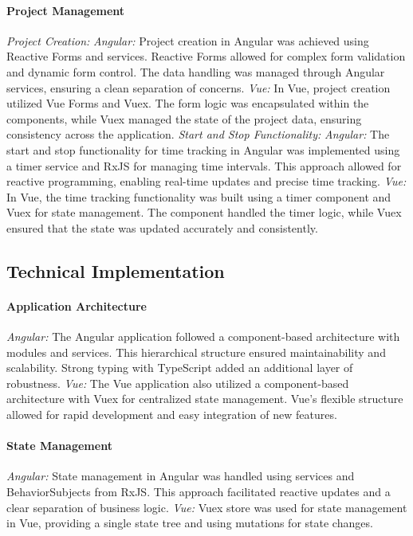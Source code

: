 \documentclass[conference]{IEEEtran}
\begin{document}
\paragraph{Project Management}
\textit{Project Creation:\newline}
\textit{Angular: }Project creation in Angular was achieved using Reactive Forms and services. Reactive Forms allowed for complex form validation and dynamic form control. The data handling was managed through Angular services, ensuring a clean separation of concerns.
\newline\textit{Vue: }In Vue, project creation utilized Vue Forms and Vuex. The form logic was encapsulated within the components, while Vuex managed the state of the project data, ensuring consistency across the application.
\newline\newline
\textit{Start and Stop Functionality:\newline}
\textit{Angular: }The start and stop functionality for time tracking in Angular was implemented using a timer service and RxJS for managing time intervals. This approach allowed for reactive programming, enabling real-time updates and precise time tracking.
\newline\textit{Vue: }In Vue, the time tracking functionality was built using a timer component and Vuex for state management. The component handled the timer logic, while Vuex ensured that the state was updated accurately and consistently.
\subsection{Technical Implementation}
\paragraph{Application Architecture}
\textit{Angular: }The Angular application followed a component-based architecture with modules and services. This hierarchical structure ensured maintainability and scalability. Strong typing with TypeScript added an additional layer of robustness.
\newline\textit{Vue: }The Vue application also utilized a component-based architecture with Vuex for centralized state management. Vue's flexible structure allowed for rapid development and easy integration of new features.
\paragraph{State Management}
\textit{Angular: }State management in Angular was handled using services and BehaviorSubjects from RxJS. This approach facilitated reactive updates and a clear separation of business logic.
\newline\textit{Vue: }Vuex store was used for state management in Vue, providing a single state tree and using mutations for state changes.
\end{document}
